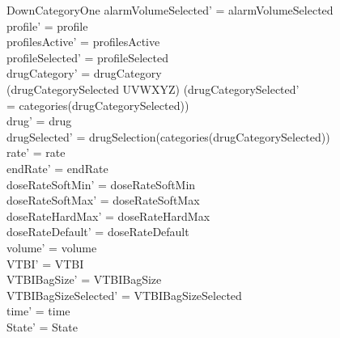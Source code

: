 \begin{schema}{DownCategoryOne}
	alarmVolumeSelected' = alarmVolumeSelected\\
	profile' = profile\\
	profilesActive' = profilesActive\\  
	profileSelected' = profileSelected\\
	drugCategory' = drugCategory\\ 
	(drugCategorySelected \neq UVWXYZ) \land (drugCategorySelected' \\
	\pagebreak
	= categories(drugCategorySelected))\\
	drug' = drug\\ 
	drugSelected' = drugSelection(categories(drugCategorySelected))\\
	rate' = rate\\
	endRate' = endRate\\
	doseRateSoftMin' = doseRateSoftMin\\
	doseRateSoftMax' = doseRateSoftMax\\
	doseRateHardMax' = doseRateHardMax\\
	doseRateDefault' = doseRateDefault\\
	volume' = volume\\
	VTBI' = VTBI\\
	VTBIBagSize' = VTBIBagSize\\ VTBIBagSizeSelected' = VTBIBagSizeSelected\\
	time' = time\\ State' = State\\

\end{schema}

